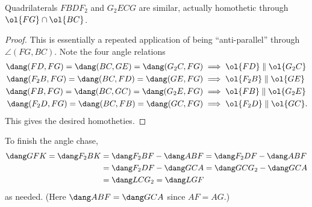 \begin{claim*}
  Quadrilaterals $FBDF_2$ and $G_2ECG$ are similar,
  actually homothetic through $\ol{FG} \cap \ol{BC}$.
\end{claim*}
\begin{proof}
  This is essentially a repeated application
  of being ``anti-parallel'' through $\angle(FG, BC)$.
  Note the four angle relations
  \begin{align*}
    \dang(FD, FG) = \dang(BC,GE) = \dang(G_2C,FG)
      &\implies \ol{FD} \parallel \ol{G_2C} \\
    \dang(F_2B, FG) = \dang(BC,FD) = \dang(GE,FG)
      &\implies \ol{F_2B} \parallel \ol{GE} \\
    \dang(FB, FG)  = \dang(BC,GC) = \dang(G_2E,FG)
      &\implies \ol{FB} \parallel \ol{G_2E} \\
    \dang(F_2D, FG)  = \dang(BC,FB) = \dang(GC,FG)
      &\implies \ol{F_2D} \parallel \ol{GC}.
  \end{align*}
  This gives the desired homotheties.
\end{proof}
To finish the angle chase,
\begin{align*}
  \dang GFK = \dang F_2BK &= \dang F_2BF - \dang ABF
  = \dang F_2DF - \dang ABF \\
  &= \dang F_2DF - \dang GCA
  = \dang GCG_2 - \dang GCA \\
  &=  \dang LCG_2 = \dang LGF
\end{align*}
as needed.
(Here $\dang ABF = \dang GCA$ since $AF = AG$.)
\pagebreak